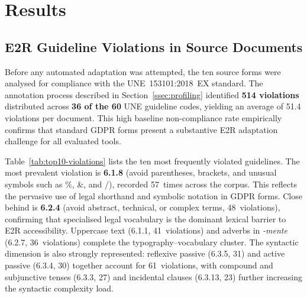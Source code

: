 \documentclass[12pt, a4paper]{article}
\begin{document}
\section{Results}
\label{sec:results}

\subsection{E2R Guideline Violations in Source Documents}
\label{ssec:violations}

Before any automated adaptation was attempted, the ten source forms were analysed for
compliance with the UNE~153101:2018~EX standard. The annotation process described in
Section~\ref{ssec:profiling} identified \textbf{514 violations} distributed across
\textbf{36 of the 60} UNE guideline codes, yielding an average of 51.4 violations per
document. This high baseline non-compliance rate empirically confirms that standard GDPR
forms present a substantive E2R adaptation challenge for all evaluated tools.

Table~\ref{tab:top10-violations} lists the ten most frequently violated guidelines. The
most prevalent violation is \textbf{6.1.8} (avoid parentheses, brackets, and unusual
symbols such as \%, \&, and /), recorded 57~times across the corpus. This reflects the
pervasive use of legal shorthand and symbolic notation in GDPR forms. Close behind is
\textbf{6.2.4} (avoid abstract, technical, or complex terms, 48~violations), confirming
that specialised legal vocabulary is the dominant lexical barrier to E2R accessibility.
Uppercase text (6.1.1, 41~violations) and adverbs in \textit{-mente} (6.2.7,
36~violations) complete the typography--vocabulary cluster. The syntactic dimension is
also strongly represented: reflexive passive (6.3.5, 31) and active passive (6.3.4, 30)
together account for 61~violations, with compound and subjunctive tenses (6.3.3, 27) and
incidental clauses (6.3.13, 23) further increasing the syntactic complexity load.
\end{document}
